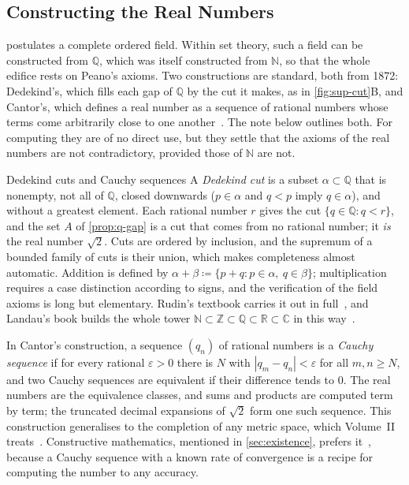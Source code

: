 \subsection{Constructing the Real Numbers}

 postulates a complete ordered field. Within set theory, such a field can be constructed from $\mathbb Q$, which was itself constructed from $\mathbb N$, so that the whole edifice rests on Peano's axioms. Two constructions are standard, both from 1872: Dedekind's, which fills each gap of $\mathbb Q$ by the cut it makes, as in \cref{fig:sup-cut}B, and Cantor's, which defines a real number as a sequence of rational numbers whose terms come arbitrarily close to one another~\cite{dedekind1872,ebbinghaus1991}. The note below outlines both. For computing they are of no direct use, but they settle that the axioms of the real numbers are not contradictory, provided those of $\mathbb N$ are not.

\begin{note}{Dedekind cuts and Cauchy sequences}
A \emph{Dedekind cut} is a subset $\alpha\subset\mathbb Q$ that is nonempty, not all of $\mathbb Q$, closed downwards ($p\in\alpha$ and $q<p$ imply $q\in\alpha$), and without a greatest element. Each rational number $r$ gives the cut $\{q\in\mathbb Q: q<r\}$, and the set $A$ of \cref{prop:q-gap} is a cut that comes from no rational number; it \emph{is} the real number $\sqrt2$. Cuts are ordered by inclusion, and the supremum of a bounded family of cuts is their union, which makes completeness almost automatic. Addition is defined by $\alpha+\beta\coloneqq\{p+q: p\in\alpha,\ q\in\beta\}$; multiplication requires a case distinction according to signs, and the verification of the field axioms is long but elementary. Rudin's textbook carries it out in full~\cite{rudin1976}, and Landau's book builds the whole tower $\mathbb N\subset\mathbb Z\subset\mathbb Q\subset\mathbb R\subset\mathbb C$ in this way~\cite{landau1930}.

In Cantor's construction, a sequence $(q_n)$ of rational numbers is a \emph{Cauchy sequence} if for every rational $\varepsilon>0$ there is $N$ with $|q_m-q_n|<\varepsilon$ for all $m,n\ge N$, and two Cauchy sequences are equivalent if their difference tends to $0$. The real numbers are the equivalence classes, and sums and products are computed term by term; the truncated decimal expansions of $\sqrt2$ form one such sequence. This construction generalises to the completion of any metric space, which Volume~II treats~\cite{ebbinghaus1991}. Constructive mathematics, mentioned in \cref{sec:existence}, prefers it~\cite{bishop1967}, because a Cauchy sequence with a known rate of convergence is a recipe for computing the number to any accuracy.
\end{note}

